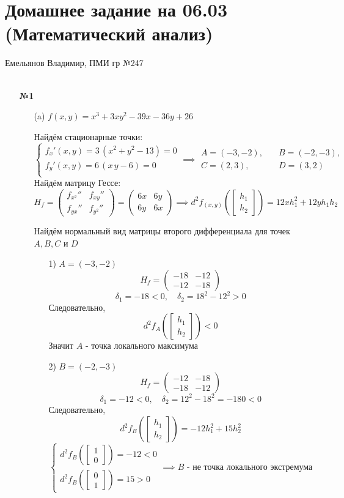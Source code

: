 \documentclass[a4paper]{article}
\newcommand{\mat}[1]{\begin{pmatrix} #1 \end{pmatrix}}
\newcommand{\matsq}[1]{\begin{bmatrix} #1 \end{bmatrix}}
\newcommand{\case}[1]{\begin{cases} #1 \end{cases}}
\begin{document}
\section*{Домашнее задание на 06.03 (Математический анализ)}
 {\large Емельянов Владимир, ПМИ гр №247}\\\\
\begin{enumerate}
    \item[\textbf{№1}]
    \begin{enumerate}
        \item[(a)]
        $f(x, y) = x^3 + 3xy^2 - 39x - 36y + 26$
        
        Найдём стационарные точки:
        $$\case{
            f_x'(x, y) =3\,\left({x}^{2}+{y}^{2}-13\right) =0\\
            f_y'(x, y) = 6\,\left(x\,y-6\right)=0\\
        }\implies \begin{aligned}
            A = (-3, -2), &\quad B= (-2, -3),\\
            C = (2, 3), & \quad D = (3, 2) 
        \end{aligned}$$
        Найдём матрицу Гессе:
        $$H_f = \mat{
            f_{x^2}'' & f_{xy}''\\
            f_{yx}'' & f_{y^2}''
        } = \mat{
            6x & 6y\\
            6y& 6x
        } \implies d^2f_{(x, y)}\left(\matsq{h_1\\h_2}\right) = 12xh_1^2+12yh_1h_2$$
    
        Найдём нормальный вид матрицы второго дифференциала для точек $A, B, C$ и $D$
        \begin{enumerate}
            \item[1)] $A = (-3, -2)$
            $$H_f = \mat{
            -18 & -12\\
            -12 & -18}$$
            $$\delta_1 = -18 < 0, \quad \delta_2  = 18^2-12^2 > 0$$
            Следовательно, 
            $$d^2f_{A}\left(\matsq{h_1\\h_2}\right) < 0$$
            Значит $A$ - точка локального максимума
    
            \item[2)] $B = (-2, -3)$
            $$H_f = \mat{
            -12 & -18\\
            -18 & -12}$$
            $$\delta_1 = -12 < 0, \quad \delta_2  = 12^2-18^2=-180 < 0$$
            Следовательно, 
            $$d^2f_{B}\left(\matsq{h_1\\h_2}\right) = -12h_1^2+15h_2^2$$
            $$\case{
                d^2f_{B}\left(\matsq{1\\0}\right) = -12 < 0\\
                d^2f_{B}\left(\matsq{0\\1}\right) = 15 > 0
            } \implies B \text{ - не точка локального экстремума}$$
    

\end{enumerate}
\end{enumerate}
\end{enumerate}
\end{document}
